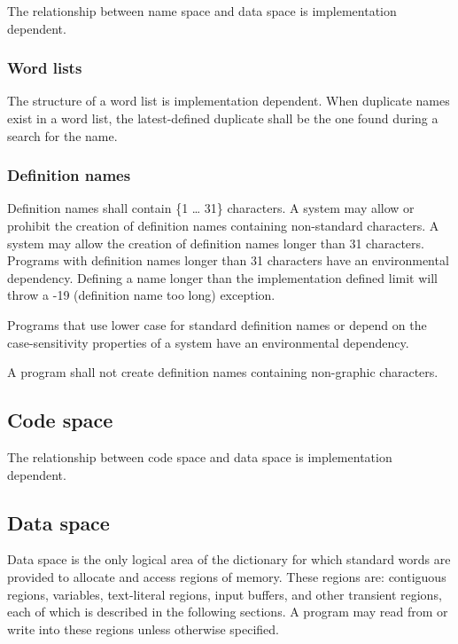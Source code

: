 The relationship between name space and data space is implementation
dependent.

\subsubsection{Word lists} %

The structure of a word list is implementation dependent. When
duplicate names exist in a word list, the latest-defined duplicate
shall be the one found during a search for the name.

\subsubsection{Definition names} %
\label{usage:names}

Definition names shall contain \{1 {\ldots} 31\} characters.
A system may allow or prohibit the creation of definition names
containing non-standard characters.  A system may allow the creation
of definition names longer than 31 characters.  Programs with
definition names longer than 31 characters have an environmental
dependency.  Defining a name longer than the implementation defined
limit will throw a -19 (definition name too long) exception.

Programs that use lower case for standard definition names or depend
on the case-sensitivity properties of a system have an environmental
dependency.

A program shall not create definition names containing non-graphic
characters.

\subsection{Code space} %

The relationship between code space and data space is implementation
dependent.

\subsection{Data space} %
\label{usage:dataspace}

Data space is the only logical area of the dictionary for which
standard words are provided to allocate and access regions of
memory. These regions are: contiguous regions, variables,
text-literal regions, input buffers, and other transient regions,
each of which is described in the following sections. A program may
read from or write into these regions unless otherwise specified.

